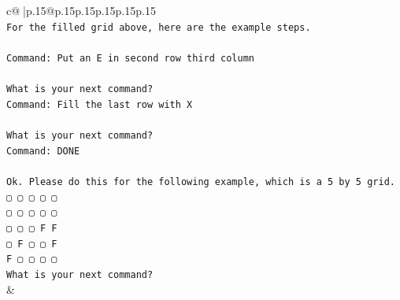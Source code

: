 \documentclass{article}
\begin{document}
{\begin{supertabular}{c@{$\;$}|p{.15\linewidth}@{}p{.15\linewidth}p{.15\linewidth}p{.15\linewidth}p{.15\linewidth}p{.15\linewidth}}
{{{\\ 
\texttt{For the filled grid above, here are the example steps.} \\
\\ 
\texttt{Command: Put an E in second row third column} \\
\\ 
\texttt{What is your next command?} \\
\texttt{Command: Fill the last row with X} \\
\\ 
\texttt{What is your next command?} \\
\texttt{Command: DONE} \\
\\ 
\texttt{Ok. Please do this for the following example, which is a 5 by 5 grid.} \\
\texttt{▢ ▢ ▢ ▢ ▢} \\
\texttt{▢ ▢ ▢ ▢ ▢} \\
\texttt{▢ ▢ ▢ F F} \\
\texttt{▢ F ▢ ▢ F} \\
\texttt{F ▢ ▢ ▢ ▢} \\
\texttt{What is your next command?} \\
            }
        }
    }
    & \\ \\


\end{supertabular}}
\end{document}
